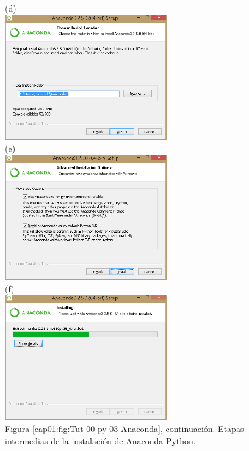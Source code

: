 \documentclass[10pt,a4paper]{article}\usepackage[]{graphicx}\usepackage[]{color}
\newcounter {cont01}
\begin{document}
\begin{figure}[p]
\begin{center}
(d)\\[1cm]
\includegraphics[width=7cm]{../fig/Tut-00-py-06-Anaconda.png}\\[1cm]
(e)\\[1cm]
\includegraphics[width=7cm]{../fig/Tut-00-py-07-Anaconda.png}\\[1cm]
(f)\\[1cm]
\includegraphics[width=7cm]{../fig/Tut-00-py-08-Anaconda.png}\\[1cm]
{Figura \ref{cap01:fig:Tut-00-py-03-Anaconda}, continuación. Etapas intermedias de la instalación de Anaconda Python.}
\end{center}
\end{figure}
\end{document}
